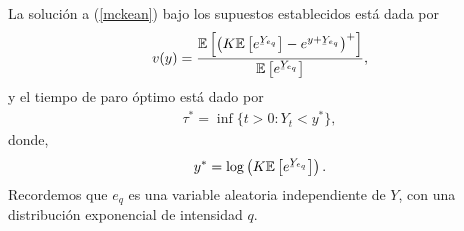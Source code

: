 \begin{theorem}
\label{solu_mckean}
La solución a (\ref{mckean}) bajo los supuestos establecidos está dada por
\begin{align*}
v(y) = \frac{ \mathbb{E}  \left[ \left( K \mathbb{E}\left[ e^{\ubar{Y}_{e_q}} \right] - e^{y + \ubar{Y}_{e_q}}  \right)^{+} \right] }{ \mathbb{E} \left[ e^{\ubar{Y}_{e_q}} \right] },
\end{align*}
y el tiempo de paro óptimo está dado por
\begin{align*}
\tau^{*} = \inf \{ t > 0 : Y_t < y^{*} \},
\end{align*}
donde, 
\begin{align*}
y^{*} = \log \left( K \mathbb{E} \left[ e^{\ubar{Y}_{e_q}} \right] \right).
\end{align*}
Recordemos que $e_q$ es una variable aleatoria independiente de $Y$, con una distribución exponencial de intensidad $q$.
\end{theorem}
